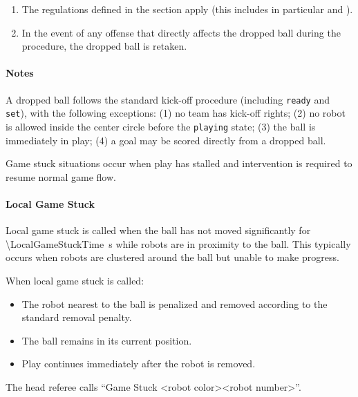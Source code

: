 \begin{enumerate}
    \item The regulations defined in the section  apply (this includes in particular  and ).
    \item In the event of any offense that directly affects the dropped ball during the procedure, the dropped ball is retaken.
\end{enumerate}

\paragraph{Notes}

A dropped ball follows the standard kick-off procedure  (including \texttt{ready} and \texttt{set}), with the following exceptions: 
(1) no team has kick-off rights;
(2) no robot is allowed inside the center circle before the \texttt{playing} state;
(3) the ball is immediately in play;
(4) a goal may be scored directly from a dropped ball.


\label{sec:game_stuck}

Game stuck situations occur when play has stalled and intervention is required to resume normal game flow.

\paragraph{Local Game Stuck}
\label{sec:local_game_stuck}

Local game stuck is called when the ball has not moved significantly for \qty{\LocalGameStuckTime}{\second} while robots are in proximity to the ball. This typically occurs when robots are clustered around the ball but unable to make progress.

When local game stuck is called:
\begin{itemize}
  \item The robot nearest to the ball is penalized and removed according to the standard removal penalty.
  \item The ball remains in its current position.
  \item Play continues immediately after the robot is removed.
\end{itemize}

The head referee calls ``Game Stuck \textless robot color\textgreater \textless robot number\textgreater''.

